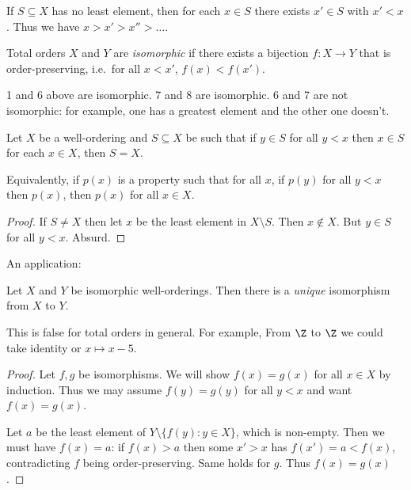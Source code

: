 \documentclass[a4paper]{article}
\begin{document}
\begin{corollary}
  If \(S \subseteq X\) has no least element, then for each \(x \in S\) there exists \(x' \in S\) with \(x' < x\). Thus we have \(x > x' > x'' > \dots\).
\end{corollary}

\begin{definition}
  Total orders \(X\) and \(Y\) are \emph{isomorphic} if there exists a bijection \(f: X \to Y\) that is order-preserving, i.e.\ for all \(x < x'\), \(f(x) < f(x')\).
\end{definition}

\begin{eg}
  1 and 6 above are isomorphic. 7 and 8 are isomorphic. 6 and 7 are not isomorphic: for example, one has a greatest element and the other one doesn't.
\end{eg}

\begin{proposition}
  Let \(X\) be a well-ordering and \(S \subseteq X\) be such that if \(y \in S\) for all \(y < x\) then \(x \in S\) for each \(x \in X\), then \(S = X\).

  Equivalently, if \(p(x)\) is a property such that for all \(x\), if \(p(y)\) for all \(y < x\) then \(p(x)\), then \(p(x)\) for all \(x \in X\).
\end{proposition}

\begin{proof}
  If \(S \neq X\) then let \(x\) be the least element in \(X \setminus S\). Then \(x \notin X\). But \(y \in S\) for all \(y < x\). Absurd.
\end{proof}

An application:

\begin{proposition}
  Let \(X\) and \(Y\) be isomorphic well-orderings. Then there is a \emph{unique} isomorphism from \(X\) to \(Y\).
\end{proposition}

\begin{remark}
  This is false for total orders in general. For example, From \(\Z\) to \(\Z\) we could take identity or \(x \mapsto x - 5\).
\end{remark}

\begin{proof}
  Let \(f, g\) be isomorphisms. We will show \(f(x) = g(x)\) for all \(x \in X\) by induction. Thus we may assume \(f(y) = g(y)\) for all \(y < x\) and want \(f(x) = g(x)\).

  Let \(a\) be the least element of \(Y \setminus \{f(y): y \in X\}\), which is non-empty. Then we must have \(f(x) = a\): if \(f(x) > a\) then some \(x' > x\) has \(f(x') = a < f(x)\), contradicting \(f\) being order-preserving. Same holds for \(g\). Thus \(f(x) = g(x)\).
\end{proof}
\end{document}
